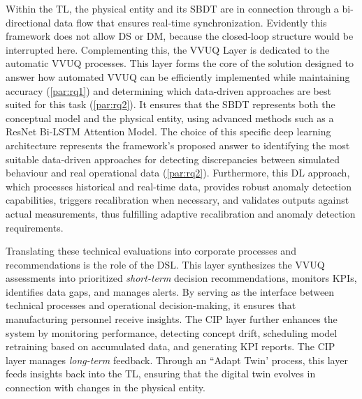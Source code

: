 Within the TL, the physical entity and its SBDT are in connection through a bi-directional data flow that ensures real-time synchronization. Evidently this framework does not allow DS or DM, because the closed-loop structure would be interrupted here. Complementing this, the VVUQ Layer is dedicated to the automatic VVUQ processes. This layer forms the core of the solution designed to answer how automated VVUQ can be efficiently implemented while maintaining accuracy (\autoref{par:rq1}) and determining which data-driven approaches are best suited for this task (\autoref{par:rq2}). It ensures that the SBDT represents both the conceptual model and the physical entity, using advanced methods such as a ResNet Bi-LSTM Attention Model. The choice of this specific deep learning architecture represents the framework's proposed answer to identifying the most suitable data-driven approaches for detecting discrepancies between simulated behaviour and real operational data (\autoref{par:rq2}). Furthermore, this DL approach, which processes historical and real-time data, provides robust anomaly detection capabilities, triggers recalibration when necessary, and validates outputs against actual measurements, thus fulfilling adaptive recalibration and anomaly detection requirements.

Translating these technical evaluations into corporate processes and recommendations is the role of the DSL. This layer synthesizes the VVUQ assessments into prioritized \textit{short-term} decision recommendations, monitors KPIs, identifies data gaps, and manages alerts. By serving as the interface between technical processes and operational decision-making, it ensures that manufacturing personnel receive insights. The CIP layer further enhances the system by monitoring performance, detecting concept drift, scheduling model retraining based on accumulated data, and generating KPI reports. The CIP layer manages \textit{long-term} feedback. Through an ``Adapt Twin' process, this layer feeds insights back into the TL, ensuring that the digital twin evolves in connection with changes in the physical entity.

